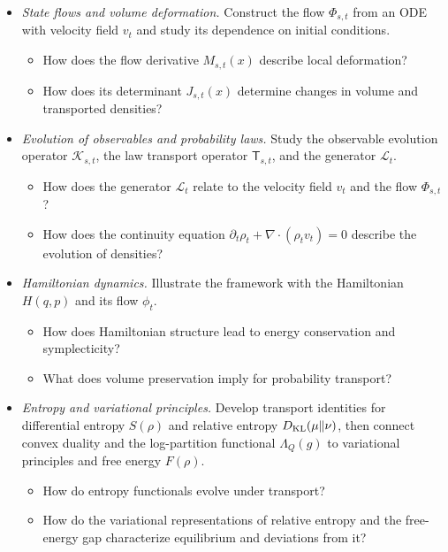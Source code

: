 \documentclass[12pt,a4paper,oneside]{book}
\begin{document}
\begin{itemize}
    \item \emph{State flows and volume deformation.}
        Construct the flow $\Phi_{s,t}$ from an ODE with velocity field $v_t$ and study its dependence on initial conditions.
        \begin{itemize}
            \item How does the flow derivative $M_{s,t}(x)$ describe local deformation?
            \item How does its determinant $J_{s,t}(x)$ determine changes in volume and transported densities?
        \end{itemize}

    \item \emph{Evolution of observables and probability laws.}
        Study the observable evolution operator $\mathcal{K}_{s,t}$, the law transport operator $\mathsf T_{s,t}$, and the
        generator $\mathcal L_t$.
        \begin{itemize}
            \item How does the generator $\mathcal L_t$ relate to the velocity field $v_t$ and the flow $\Phi_{s,t}$?
            \item How does the continuity equation $\partial_t\rho_t+\nabla\cdot(\rho_tv_t)=0$ describe the evolution of
                densities?
        \end{itemize}

    \item \emph{Hamiltonian dynamics.}
        Illustrate the framework with the Hamiltonian $H(q,p)$ and its flow $\phi_t$.
        \begin{itemize}
            \item How does Hamiltonian structure lead to energy conservation and symplecticity?
            \item What does volume preservation imply for probability transport?
        \end{itemize}

    \item \emph{Entropy and variational principles.}
        Develop transport identities for differential entropy $S(\rho)$ and relative entropy $D_{\mathrm{KL}}(\mu\Vert\nu)$, then
        connect convex duality and the log-partition functional $\Lambda_Q(g)$ to variational principles and free
        energy $F(\rho)$.
        \begin{itemize}
            \item How do entropy functionals evolve under transport?
            \item How do the variational representations of relative entropy and the free-energy gap characterize equilibrium
                and deviations from it?
        \end{itemize}
\end{itemize}
\end{document}
